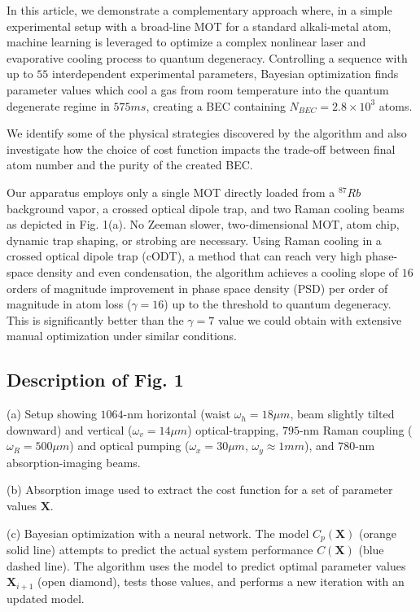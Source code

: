 \documentclass{article}
\begin{document}
In this article, we demonstrate a complementary approach where, in a simple experimental setup with a broad-line MOT for a standard alkali-metal atom, machine learning is leveraged to optimize a complex nonlinear laser and evaporative cooling process to quantum degeneracy. Controlling a sequence with up to $55$ interdependent experimental parameters, Bayesian optimization finds parameter values which cool a gas from room temperature into the quantum degenerate regime in $575 ms$, creating a BEC containing $N_{BEC} = 2.8 \times 10^3$ atoms.

We identify some of the physical strategies discovered by the algorithm and also investigate how the choice of cost function impacts the trade-off between final atom number and the purity of the created BEC.

Our apparatus employs only a single MOT directly loaded from a $^{87}Rb$ background vapor, a crossed optical dipole trap, and two Raman cooling beams as depicted in Fig. 1(a). No Zeeman slower, two-dimensional MOT, atom chip, dynamic trap shaping, or strobing are necessary. Using Raman cooling in a crossed optical dipole trap (cODT), a method that can reach very high phase-space density and even condensation, the algorithm achieves a cooling slope of $16$ orders of magnitude improvement in phase space density (PSD) per order of magnitude in atom loss ($\gamma = 16$) up to the threshold to quantum degeneracy. This is significantly better than the $\gamma = 7$ value we could obtain with extensive manual optimization under similar conditions.

\subsection{Description of Fig. 1}

(a) Setup showing $1064$-nm horizontal (waist $\omega_h = 18 \mu m$, beam slightly tilted downward) and vertical ($\omega_v = 14 \mu m$) optical-trapping, $795$-nm Raman coupling ($\omega_R = 500 \mu m$) and optical pumping ($\omega_x = 30 \mu m$, $\omega_y \approx 1 mm$), and $780$-nm absorption-imaging beams. 

(b) Absorption image used to extract the cost function for a set of parameter values $\mathbf{X}$. 

(c) Bayesian optimization with a neural network. The model $C_p(\mathbf{X})$ (orange solid line) attempts to predict the actual system performance $C(\mathbf{X})$ (blue dashed line). The algorithm uses the model to predict optimal parameter values $\mathbf{X}_{i+1}$ (open diamond), tests those values, and performs a new iteration with an updated model.
\end{document}

